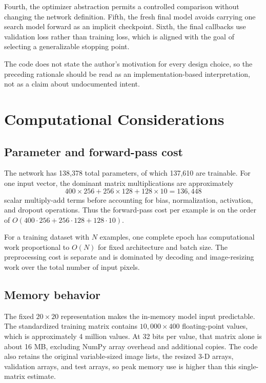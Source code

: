 \documentclass[11pt,a4paper]{article}
\begin{document}
Fourth, the optimizer abstraction permits a controlled comparison without changing the network definition. Fifth, the fresh final model avoids carrying one search model forward as an implicit checkpoint. Sixth, the final callbacks use validation loss rather than training loss, which is aligned with the goal of selecting a generalizable stopping point.

The code does not state the author's motivation for every design choice, so the preceding rationale should be read as an implementation-based interpretation, not as a claim about undocumented intent.

\section{Computational Considerations}
\subsection{Parameter and forward-pass cost}
The network has 138,378 total parameters, of which 137,610 are trainable. For one input vector, the dominant matrix multiplications are approximately
\begin{equation}
400\times256 + 256\times128 + 128\times10 = 136{,}448
\end{equation}
scalar multiply-add terms before accounting for bias, normalization, activation, and dropout operations. Thus the forward-pass cost per example is on the order of $O(400\cdot256+256\cdot128+128\cdot10)$.

For a training dataset with $N$ examples, one complete epoch has computational work proportional to $O(N)$ for fixed architecture and batch size. The preprocessing cost is separate and is dominated by decoding and image-resizing work over the total number of input pixels.

\subsection{Memory behavior}
The fixed $20\times20$ representation makes the in-memory model input predictable. The standardized training matrix contains $10{,}000\times400$ floating-point values, which is approximately 4 million values. At 32 bits per value, that matrix alone is about 16 MB, excluding NumPy array overhead and additional copies. The code also retains the original variable-sized image lists, the resized 3-D arrays, validation arrays, and test arrays, so peak memory use is higher than this single-matrix estimate.
\end{document}
